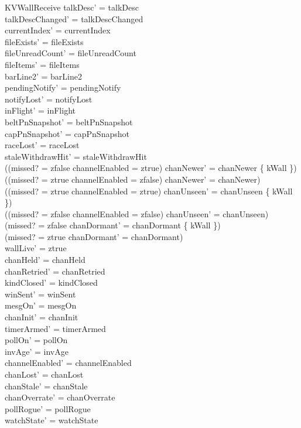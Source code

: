 \documentclass[a4paper,10pt,fleqn]{article}
\begin{document}
\begin{schema}{KVWallReceive}
  talkDesc' = talkDesc \\
  talkDescChanged' = talkDescChanged \\
  currentIndex' = currentIndex \\
  fileExists' = fileExists \\
  fileUnreadCount' = fileUnreadCount \\
  fileItems' = fileItems \\
  barLine2' = barLine2 \\
  pendingNotify' = pendingNotify \\
  notifyLost' = notifyLost \\
  inFlight' = inFlight \\
  beltPnSnapshot' = beltPnSnapshot \\
  capPnSnapshot' = capPnSnapshot \\
  raceLost' = raceLost \\
  staleWithdrawHit' = staleWithdrawHit \\
  ((missed? = zfalse \land channelEnabled = ztrue) \implies
  chanNewer' = chanNewer \cup \{ kWall \}) \\
  ((missed? = ztrue \lor channelEnabled = zfalse) \implies
  chanNewer' = chanNewer) \\
  ((missed? = ztrue \land channelEnabled = ztrue) \implies
  chanUnseen' = chanUnseen \cup \{ kWall \}) \\
  ((missed? = zfalse \lor channelEnabled = zfalse) \implies
  chanUnseen' = chanUnseen) \\
  (missed? = zfalse \implies
  chanDormant' = chanDormant \setminus \{ kWall \}) \\
  (missed? = ztrue \implies chanDormant' = chanDormant) \\
  wallLive' = ztrue \\
  chanHeld' = chanHeld \\
  chanRetried' = chanRetried \\
  kindClosed' = kindClosed \\
  winSent' = winSent \\
  mesgOn' = mesgOn \\
  chanInit' = chanInit \\
  timerArmed' = timerArmed \\
  pollOn' = pollOn \\
  invAge' = invAge \\
  channelEnabled' = channelEnabled \\
  chanLost' = chanLost \\
  chanStale' = chanStale \\
  chanOverrate' = chanOverrate \\
  pollRogue' = pollRogue \\
  watchState' = watchState
\end{schema}
\end{document}

